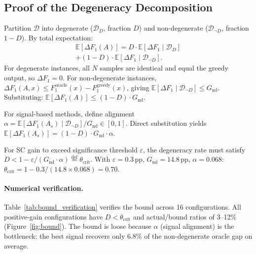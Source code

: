 \subsection{Proof of the Degeneracy Decomposition}

Partition $\mathcal{D}$ into degenerate ($\mathcal{D}_D$, fraction $D$) and non-degenerate ($\mathcal{D}_{\neg D}$, fraction $1{-}D$). By total expectation:
\begin{multline}\label{eq:bound_decomp}
\mathbb{E}[\Delta F_1(A)] = D \cdot \mathbb{E}[\Delta F_1 \mid \mathcal{D}_D] \\
+ (1{-}D) \cdot \mathbb{E}[\Delta F_1 \mid \mathcal{D}_{\neg D}].
\end{multline}
For degenerate instances, all $N$ samples are identical and equal the greedy output, so $\Delta F_1 = 0$. For non-degenerate instances, $\Delta F_1(A,x) \leq F_1^{\text{oracle}}(x) - F_1^{\text{greedy}}(x)$, giving $\mathbb{E}[\Delta F_1 \mid \mathcal{D}_{\neg D}] \leq G_{\text{nd}}$. Substituting: $\mathbb{E}[\Delta F_1(A)] \leq (1{-}D) \cdot G_{\text{nd}}$.

For signal-based methods, define alignment $\alpha = \mathbb{E}[\Delta F_1(A_s) \mid \mathcal{D}_{\neg D}] / G_{\text{nd}} \in [0,1]$. Direct substitution yields $\mathbb{E}[\Delta F_1(A_s)] = (1{-}D) \cdot G_{\text{nd}} \cdot \alpha$.

\begin{corollary}\label{cor:theta_crit}
For SC gain to exceed significance threshold $\varepsilon$, the degeneracy rate must satisfy $D < 1 - \varepsilon / (G_{\text{nd}} \cdot \alpha) \stackrel{\text{def}}{=} \theta_{\text{crit}}$.
With $\varepsilon{=}0.3$\,pp, $G_{\text{nd}}{=}14.8$\,pp, $\alpha{=}0.068$: $\theta_{\text{crit}} = 1 - 0.3/(14.8 \times 0.068) = 0.70$.
\end{corollary}

\paragraph{Numerical verification.}
Table~\ref{tab:bound_verification} verifies the bound across 16 configurations. All positive-gain configurations have $D < \theta_{\text{crit}}$ and actual/bound ratios of 3--12\% (Figure~\ref{fig:bound}). The bound is loose because $\alpha$ (signal alignment) is the bottleneck: the best signal recovers only 6.8\% of the non-degenerate oracle gap on average.


